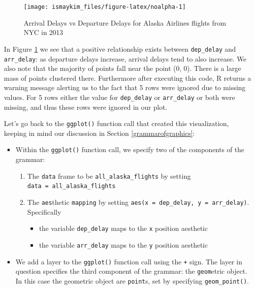 \documentclass[12pt,]{krantz}
\providecommand{\tightlist}{%
  \setlength{\itemsep}{0pt}\setlength{\parskip}{0pt}}
\theoremstyle{definition}
\theoremstyle{definition}
\theoremstyle{definition}
\theoremstyle{remark}
\begin{document}
\begin{figure}

{\centering \texttt{[image: ismaykim\_files/figure-latex/noalpha-1]} 

}

\caption{Arrival Delays vs Departure Delays for Alaska Airlines flights from NYC in 2013}\label{fig:noalpha}
\end{figure}

In Figure \ref{fig:noalpha} we see that a positive relationship exists
between \texttt{dep\_delay} and \texttt{arr\_delay}: as departure delays
increase, arrival delays tend to also increase. We also note that the
majority of points fall near the point (0, 0). There is a large mass of
points clustered there. Furthermore after executing this code, R returns
a warning message alerting us to the fact that 5 rows were ignored due
to missing values. For 5 rows either the value for \texttt{dep\_delay}
or \texttt{arr\_delay} or both were missing, and thus these rows were
ignored in our plot.

Let's go back to the \texttt{ggplot()} function call that created this
visualization, keeping in mind our discussion in Section
\ref{grammarofgraphics}:

\begin{itemize}
\tightlist
\item
  Within the \texttt{ggplot()} function call, we specify two of the
  components of the grammar:

  \begin{enumerate}
  \def\labelenumi{\arabic{enumi}.}
  \tightlist
  \item
    The \texttt{data} frame to be \texttt{all\_alaska\_flights} by
    setting \texttt{data\ =\ all\_alaska\_flights}
  \item
    The \texttt{aes}thetic \texttt{mapping} by setting
    \texttt{aes(x\ =\ dep\_delay,\ y\ =\ arr\_delay)}. Specifically

    \begin{itemize}
    \tightlist
    \item
      the variable \texttt{dep\_delay} maps to the \texttt{x} position
      aesthetic
    \item
      the variable \texttt{arr\_delay} maps to the \texttt{y} position
      aesthetic
    \end{itemize}
  \end{enumerate}
\item
  We add a layer to the \texttt{ggplot()} function call using the
  \texttt{+} sign. The layer in question specifies the third component
  of the grammar: the \texttt{geom}etric object. In this case the
  geometric object are \texttt{point}s, set by specifying
  \texttt{geom\_point()}.
\end{itemize}
\end{document}
